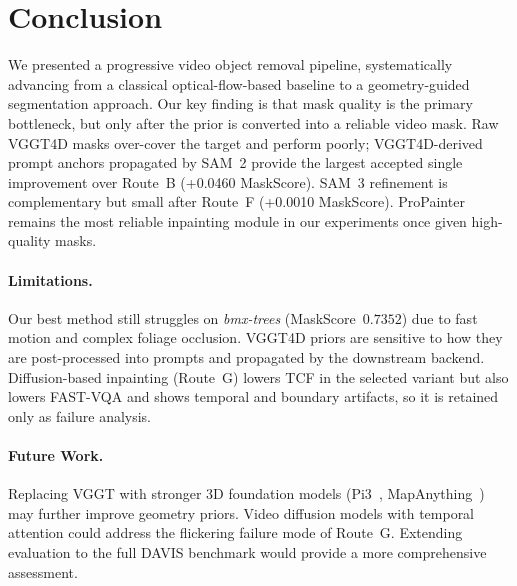 \section{Conclusion}
\label{sec:conclusion}

We presented a progressive video object removal pipeline, systematically advancing from a
classical optical-flow-based baseline to a geometry-guided segmentation approach. Our key
finding is that mask quality is the primary bottleneck, but only after the prior is
converted into a reliable video mask. Raw VGGT4D masks over-cover the target and perform
poorly; VGGT4D-derived prompt anchors propagated by SAM~2 provide the largest accepted
single improvement over Route~B (+0.0460 MaskScore). SAM~3 refinement is complementary
but small after Route~F (+0.0010 MaskScore). ProPainter remains the most reliable
inpainting module in our experiments once given high-quality masks.

\paragraph{Limitations.}
Our best method still struggles on \emph{bmx-trees} (MaskScore~$0.7352$) due to fast
motion and complex foliage occlusion. VGGT4D priors are sensitive to how they are
post-processed into prompts and propagated by the downstream backend. Diffusion-based
inpainting (Route~G) lowers TCF in the selected variant but also lowers FAST-VQA and
shows temporal and boundary artifacts, so it is retained only as failure analysis.

\paragraph{Future Work.}
Replacing VGGT with stronger 3D foundation models (Pi3~\cite{pi3},
MapAnything~\cite{mapanything}) may further improve geometry priors. Video diffusion
models with temporal attention could address the flickering failure mode of Route~G.
Extending evaluation to the full DAVIS benchmark would provide a more comprehensive
assessment.
